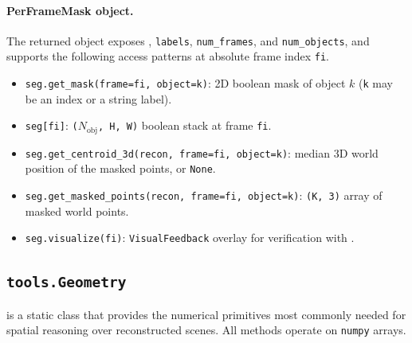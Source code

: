 \paragraph{PerFrameMask object.} The returned object exposes , \texttt{labels}, \texttt{num\_frames}, and \texttt{num\_objects}, and supports the following access patterns at absolute frame index \texttt{fi}.
\begin{itemize}[leftmargin=1.5em]
\item \texttt{seg.get\_mask(frame=fi, object=k)}: 2D boolean mask of object $k$ (\texttt{k} may be an index or a string label).
\item \texttt{seg[fi]}: \texttt{($N_{\text{obj}}$, H, W)} boolean stack at frame \texttt{fi}.
\item \texttt{seg.get\_centroid\_3d(recon, frame=fi, object=k)}: median 3D world position of the masked points, or \texttt{None}.
\item \texttt{seg.get\_masked\_points(recon, frame=fi, object=k)}: \texttt{(K, 3)} array of masked world points.
\item \texttt{seg.visualize(fi)}: \texttt{VisualFeedback} overlay for verification with .
\end{itemize}

\subsection{\texttt{tools.Geometry}}
\label{app:tool_geometry}
 is a static class that provides the numerical primitives most commonly needed for spatial reasoning over reconstructed scenes. All methods operate on \texttt{numpy} arrays.

